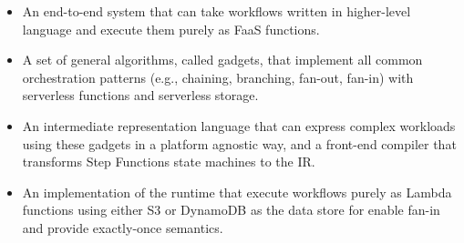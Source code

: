 \begin{itemize}

  \item An end-to-end system that can take workflows written in higher-level
  language and execute them purely as FaaS functions.

  \item A set of general algorithms, called gadgets, that implement all common
  orchestration patterns (e.g., chaining, branching, fan-out, fan-in) with
  serverless functions and serverless storage.

  \item An intermediate representation language that can express complex
  workloads using these gadgets in a platform agnostic way, and a front-end
  compiler that transforms Step Functions state machines to the IR.

  \item An implementation of the \name{} runtime that execute workflows purely
  as Lambda functions using either S3 or DynamoDB as the data store for enable
  fan-in and provide exactly-once semantics.

\end{itemize}

